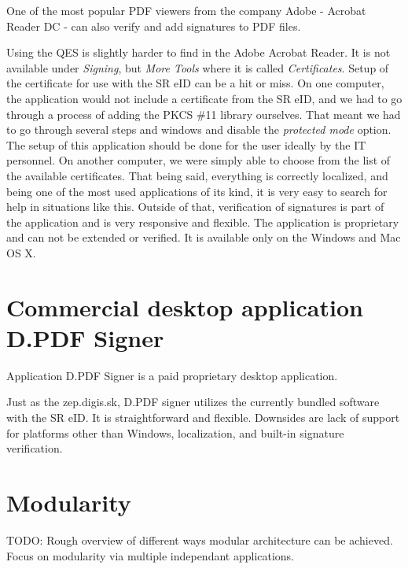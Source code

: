\documentclass[thesismargins, english, thesislinespacing, onelinechapterstyle, upjsfrontpage]{rnthesis}
\begin{document}
One of the most popular PDF viewers from the company Adobe - Acrobat Reader DC - can also verify and add signatures to PDF files.


Using the QES is slightly harder to find in the Adobe Acrobat Reader.
It is not available under \textit{Signing}, but \textit{More Tools} where it is called \textit{Certificates}.
Setup of the certificate for use with the SR eID can be a hit or miss.
On one computer, the application would not include a certificate from the SR eID, and we had to go through a process of adding the PKCS \#11 library ourselves.
That meant we had to go through several steps and windows and disable the \textit{protected mode} option.
The setup of this application should be done for the user ideally by the IT personnel.
On another computer, we were simply able to choose from the list of the available certificates.
That being said, everything is correctly localized, and being one of the most used applications of its kind, it is very easy to search for help in situations like this.
Outside of that, verification of signatures is part of the application and is very responsive and flexible.
The application is proprietary and can not be extended or verified.
It is available only on the Windows and Mac OS X.

\section{Commercial desktop application D.PDF Signer}

Application D.PDF Signer is a paid proprietary desktop application.


Just as the zep.digis.sk, D.PDF signer utilizes the currently bundled software with the SR eID.
It is straightforward and flexible.
Downsides are lack of support for platforms other than Windows, localization, and built-in signature verification.

\iffalse %
\section{Modularity}

TODO: Rough overview of different ways modular architecture can be achieved. Focus on modularity via multiple independant applications.
\end{document}
